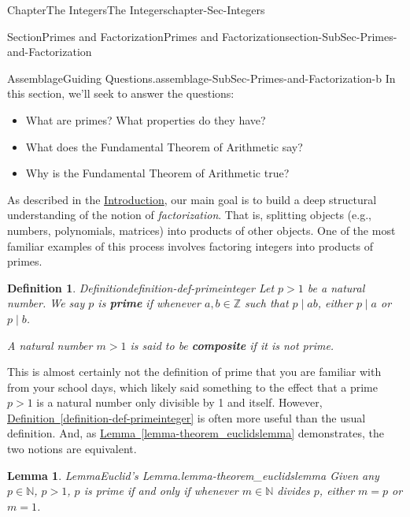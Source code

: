 \documentclass[oneside,10pt,]{book}
\newcommand{\xreffont}{\relax}
\newcommand{\terminology}[1]{\textbf{#1}}
\numberwithin{equation}{section}
\def\Z{{\mathbb Z}}
\def\N{{\mathbb N}}
\newtheorem{lemma}[theorem]{Lemma}
\newtheorem{definition}[theorem]{Definition}
\begin{document}
\begin{chapterptx}{Chapter}{The Integers}{}{The Integers}{}{}{chapter-Sec-Integers}
%
%
\typeout{************************************************}
\typeout{************************************************}
%
\begin{sectionptx}{Section}{Primes and Factorization}{}{Primes and Factorization}{}{}{section-SubSec-Primes-and-Factorization}
\begin{assemblage}{Assemblage}{Guiding Questions.}{assemblage-SubSec-Primes-and-Factorization-b}%
In this section, we'll seek to answer the questions: %
\begin{itemize}[label=\textbullet]
\item{}What are primes? What properties do they have?%
\item{}What does the Fundamental Theorem of Arithmetic say?%
\item{}Why is the Fundamental Theorem of Arithmetic true?%
\end{itemize}
%
\end{assemblage}
As described in the \hyperref[preface-Sec-Introduction]{Introduction}, our main goal is to build a deep structural understanding of the notion of \emph{factorization}. That is, splitting objects (e.g., numbers, polynomials, matrices) into products of other objects. One of the most familiar examples of this process involves factoring integers into products of primes.%
\begin{definition}{Definition}{}{definition-def-primeinteger}%
%
%
Let \(p > 1\) be a natural number. We say \(p\) is \terminology{prime} if whenever \(a,b\in \Z\) such that \(p\mid ab\), either \(p\mid a\) or \(p\mid b\).%
\par
A natural number \(m > 1\) is said to be \terminology{composite} if it is not prime.%
\end{definition}
This is almost certainly not the definition of prime that you are familiar with from your school days, which likely said something to the effect that a prime \(p > 1\) is a natural number only divisible by 1 and itself. However, \hyperref[definition-def-primeinteger]{Definition~{\xreffont\ref{definition-def-primeinteger}}} is often more useful than the usual definition. And, as \hyperref[lemma-theorem_euclidslemma]{Lemma~{\xreffont\ref{lemma-theorem_euclidslemma}}} demonstrates, the two notions are equivalent.%
\begin{lemma}{Lemma}{Euclid's Lemma.}{}{lemma-theorem_euclidslemma}%
Given any \(p\in \N\), \(p > 1\), \(p\) is prime if and only if whenever \(m\in \N\) divides \(p\), either \(m = p\) or \(m = 1\).%

\end{lemma}
\end{sectionptx}
\end{chapterptx}
\end{document}

